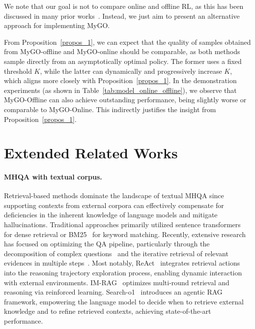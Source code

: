 We note that our goal is not to compare online and offline RL, 
as this has been discussed in many prior works~\cite{tang2024understanding}.
Instead, we just aim to present an alternative approach for implementing MyGO.

From Proposition~\ref{propos_1}, we can expect that the quality of samples obtained from MyGO-offline and MyGO-online should be comparable, as both methods sample directly from an asymptotically optimal policy.
The former uses a fixed threshold $K$, while the latter can dynamically and progressively increase $K$, which aligns more closely with Proposition~\ref{propos_1}.
In the demonstration experiments (as shown in Table~\ref{tab:model_online_offline}), we observe that MyGO-Offline can also achieve outstanding performance, being slightly worse or comparable to MyGO-Online.
This indirectly justifies the insight from Proposition~\ref{propos_1}.





\section{Extended Related Works}
\paragraph{MHQA with textual corpus.}
Retrieval-based methods dominate the landscape of textual MHQA since supporting contexts from external corpora can effectively compensate for deficiencies in the inherent knowledge of language models and mitigate hallucinations. Traditional approaches primarily utilized sentence transformers~\cite{bgem3} for dense retrieval or BM25~\cite{BM25} for keyword matching. Recently, extensive research has focused on optimizing the QA pipeline, particularly through the decomposition of complex questions~\cite{IM-RAG,ReAct} and the iterative retrieval of relevant evidences in multiple steps~\cite{SelfRAG,ReSP,Iter-RetRAG,IRCoT}. Most notably, ReAct~\cite{ReAct} integrates retrieval actions into the reasoning trajectory exploration process, enabling dynamic interaction with external environments. IM-RAG~\cite{IM-RAG} optimizes multi-round retrieval and reasoning via reinforced learning. Search-o1~\cite{Search-o1} introduces an agentic RAG framework, empowering the language model to decide when to retrieve external knowledge and to refine retrieved contexts, achieving state-of-the-art performance.


